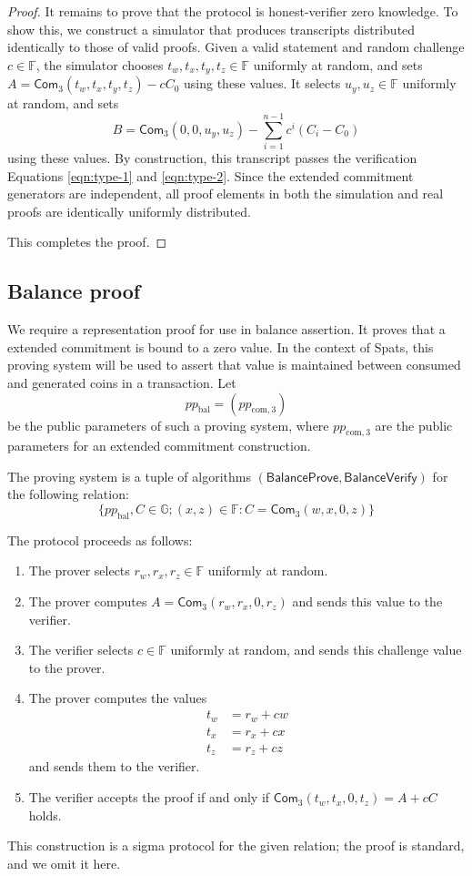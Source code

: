 \documentclass{article}
\newcommand{\G}{\mathbb{G}}
\newcommand{\F}{\mathbb{F}}
\newcommand{\func}[1]{\mathsf{#1}}
\newcommand{\com}{\func{Com}}
\begin{document}
\begin{proof}
It remains to prove that the protocol is honest-verifier zero knowledge.
To show this, we construct a simulator that produces transcripts distributed identically to those of valid proofs.
Given a valid statement and random challenge $c \in \F$, the simulator chooses $t_w, t_x, t_y, t_z \in \F$ uniformly at random, and sets $A = \com_3(t_w, t_x, t_y, t_z) - cC_0$ using these values.
It selects $u_y, u_z \in \F$ uniformly at random, and sets
$$B = \com_3(0, 0, u_y, u_z) - \sum_{i=1}^{n-1} c^i(C_i - C_0)$$
using these values.
By construction, this transcript passes the verification Equations \ref{eqn:type-1} and \ref{eqn:type-2}.
Since the extended commitment generators are independent, all proof elements in both the simulation and real proofs are identically uniformly distributed.

This completes the proof.
\end{proof}


\subsection{Balance proof}

We require a representation proof for use in balance assertion.
It proves that a extended commitment is bound to a zero value.
In the context of Spats, this proving system will be used to assert that value is maintained between consumed and generated coins in a transaction.
Let $$pp_{\text{bal}} = ( pp_{\text{com},3})$$ be the public parameters of such a proving system, where $pp_{\text{com},3}$ are the public parameters for an extended commitment construction.

The proving system is a tuple of algorithms $(\func{BalanceProve}, \func{BalanceVerify})$ for the following relation:
$$\{ pp_{\text{bal}}, C \in \G ; (x, z) \in \F : C = \com_3(w, x, 0, z) \}$$

The protocol proceeds as follows:
\begin{enumerate}
    \item The prover selects $r_w, r_x, r_z \in \F$ uniformly at random.
    \item The prover computes $A = \com_3(r_w, r_x, 0, r_z)$ and sends this value to the verifier.
    \item The verifier selects $c \in \F$ uniformly at random, and sends this challenge value to the prover.
    \item The prover computes the values
    \begin{align*}
        t_w &= r_w + cw \\
        t_x &= r_x + cx \\
        t_z &= r_z + cz
    \end{align*}
    and sends them to the verifier.
    \item The verifier accepts the proof if and only if $\com_3(t_w, t_x, 0, t_z) = A + cC$ holds.
\end{enumerate}
This construction is a sigma protocol for the given relation; the proof is standard, and we omit it here.
\end{document}
